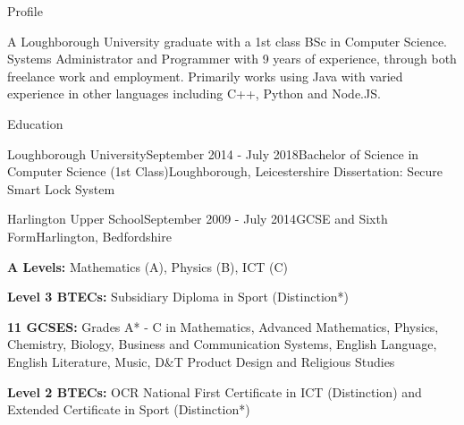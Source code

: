 \documentclass{resume} %
\begin{document}

\begin {rSection}{Profile}

A Loughborough University graduate with a 1st class BSc in Computer Science. Systems Administrator and Programmer with 9 years of experience, through both freelance work and employment. Primarily works using Java with varied experience in other languages including C++, Python and Node.JS.

\end{rSection}


\begin{rSection}{Education}

\begin{rSubsection}{Loughborough University}{September 2014 - July 2018}{Bachelor of Science in Computer Science (1st Class)}{Loughborough, Leicestershire}
Dissertation: Secure Smart Lock System
\end{rSubsection}

\begin{rSubsection}{Harlington Upper School}{September 2009 - July 2014}{GCSE and Sixth Form}{Harlington, Bedfordshire}
\item \textbf{A Levels: } Mathematics (A), Physics (B), ICT (C)
\item \textbf{Level 3 BTECs: } Subsidiary Diploma in Sport (Distinction*) \smallskip \smallskip
\item \textbf{11 GCSES: } Grades A* - C in Mathematics, Advanced Mathematics, Physics, Chemistry, Biology, Business and Communication Systems, English Language, English Literature, Music, D\&T Product Design and Religious Studies
\item \textbf{Level 2 BTECs: } OCR National First Certificate in ICT (Distinction) and Extended Certificate in Sport (Distinction*)
\end{rSubsection}
\end{rSection}

\end{document}
